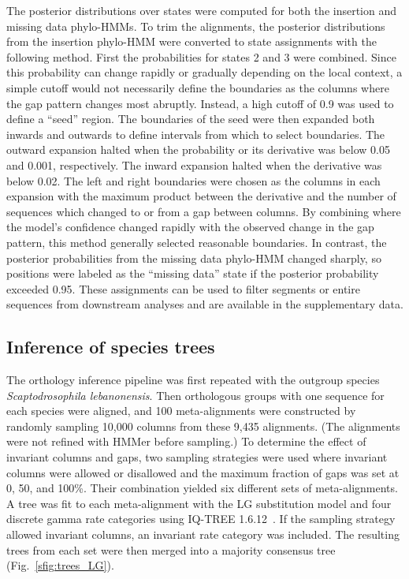 The posterior distributions over states were computed for both the insertion and missing data phylo-HMMs. To trim the alignments, the posterior distributions from the insertion phylo-HMM were converted to state assignments with the following method. First the probabilities for states 2 and 3 were combined. Since this probability can change rapidly or gradually depending on the local context, a simple cutoff would not necessarily define the boundaries as the columns where the gap pattern changes most abruptly. Instead, a high cutoff of 0.9 was used to define a “seed” region. The boundaries of the seed were then expanded both inwards and outwards to define intervals from which to select boundaries. The outward expansion halted when the probability or its derivative was below 0.05 and 0.001, respectively. The inward expansion halted when the derivative was below 0.02. The left and right boundaries were chosen as the columns in each expansion with the maximum product between the derivative and the number of sequences which changed to or from a gap between columns. By combining where the model’s confidence changed rapidly with the observed change in the gap pattern, this method generally selected reasonable boundaries. In contrast, the posterior probabilities from the missing data phylo-HMM changed sharply, so positions were labeled as the ``missing data'' state if the posterior probability exceeded 0.95. These assignments can be used to filter segments or entire sequences from downstream analyses and are available in the supplementary data.

\subsection*{Inference of species trees}
The orthology inference pipeline was first repeated with the outgroup species \textit{Scaptodrosophila lebanonensis}. Then orthologous groups with one sequence for each species were aligned, and 100 meta-alignments were constructed by randomly sampling 10,000 columns from these 9,435 alignments. (The alignments were not refined with HMMer before sampling.) To determine the effect of invariant columns and gaps, two sampling strategies were used where invariant columns were allowed or disallowed and the maximum fraction of gaps was set at 0, 50, and 100\%. Their combination yielded six different sets of meta-alignments. A tree was fit to each meta-alignment with the LG substitution model and four discrete gamma rate categories using IQ-TREE 1.6.12~\cite{Nguyen2014, Le2008, Yang1994}. If the sampling strategy allowed invariant columns, an invariant rate category was included. The resulting trees from each set were then merged into a majority consensus tree (Fig.~\ref{sfig:trees_LG}).

